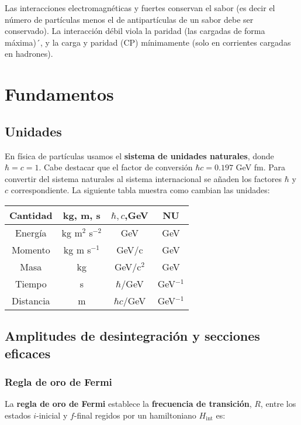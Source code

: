 Las interacciones electromagnéticas y fuertes conservan el sabor (es decir el número de partículas menos el de antipartículas de un sabor debe ser conservado). La interacción débil viola la paridad (las cargadas de forma máxima)´, y la carga y paridad (CP) mínimamente (solo en corrientes cargadas en hadrones).



\section{Fundamentos}

\subsection{Unidades}

En física de partículas usamos el \textbf{sistema de unidades naturales}, donde $\hbar=c=1$. Cabe destacar que el factor de conversión $\hbar c=0.197$ GeV fm. Para convertir del sistema naturales al sistema internacional se añaden los factores $\hbar$ y $c$ correspondiente. La siguiente tabla muestra como cambian las unidades:

\begin{table}[h!] \centering
	\begin{tabular}{c|ccc} 
		Cantidad & kg, m, s & $\hbar,c$,GeV & NU \\ \hline
		Energía & kg m$^2$ s$^{-2}$ &  GeV & GeV \\
		Momento & kg m s$^{-1}$ & GeV/c & GeV \\
		Masa & kg &  GeV/c$^2$ & GeV \\
		Tiempo & s & $\hbar$/GeV & GeV$^{-1}$\\
		Distancia & m & $\hbar c$/GeV & GeV$^{-1}$ \\
	\end{tabular}
\end{table}

\subsection{Amplitudes de desintegración y secciones eficaces}

\subsubsection{Regla de oro de Fermi}

La \textbf{regla de oro de Fermi} establece la \textbf{frecuencia de transición}, $R$, entre los estados $i$-inicial y $f$-final regidos por un hamiltoniano $H_{\text{int}}$ es:

